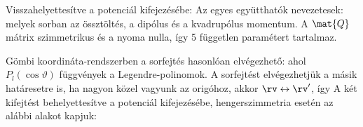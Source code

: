    Visszahelyettesítve a potenciál kifejezésébe:
   Az egyes együtthatók nevezetesek:
   melyek sorban az össztöltés, a dipólus és a kvadrupólus momentum.
   A $\mat{Q}$ mátrix szimmetrikus és a nyoma nulla, így 5 független paramétert tartalmaz. 
   
   Gömbi koordináta-rendszerben a sorfejtés hasonlóan elvégezhető:
   ahol $P_l(\cos\vartheta)$ függvények a Legendre-polinomok.
   A sorfejtést elvégezhetjük a másik határesetre is, ha nagyon közel vagyunk az origóhoz, akkor $\rv\leftrightarrow\rv'$, így 
   A két kifejtést behelyettesítve a potenciál kifejezésébe, hengerszimmetria esetén az alábbi alakot kapjuk:
   
